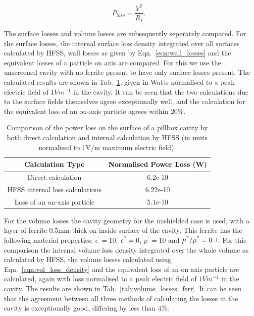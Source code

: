 \begin{equation}
P_{loss} = \frac{V^{2}}{R_{s}}.
\end{equation}

The surface losses and volume losses are subsequently seperately compared. For the surface losses, the internal surface loss density integrated over all surfaces calculated by HFSS, wall losses as given by Eqn.~\ref{eqn:wall_losses} and the equivalent losses of a particle on axis are compared. For this we use the unscreened cavity with no ferrite present to have only surface losses present. The calculated results are shown in Tab.~\ref{tab:surface_losses_ferr}, given in Watts normalised to a peak electric field of $1 V m^{-1}$ in the cavity. It can be seen that the two calculations due to the surface fields themselves agree exceptionally well, and the calculation for the equivalent loss of an on-axis particle agrees within 20\%. 

\begin{table}
\caption{Comparison of the power loss on the surface of a pillbox cavity by both direct calculation and internal calculation by HFSS (in units normalised to 1V/m maximum electric field).}
\begin{center}
\begin{tabular}{c | c }
Calculation Type & Normalised Power Loss (W)\\ \hline
Direct calculation & 6.2e-10\\ \hline
HFSS internal loss calculations & 6.22e-10 \\ \hline
Loss of an on-axis particle	 & 5.1e-10 \\
\end{tabular}
\end{center}
\label{tab:surface_losses_ferr}
\end{table}

For the volume losses the cavity geometry for the unshielded case is used, with a layer of ferrite 0.5mm thick on inside surface of the cavity. This ferrite has the following material properties; $\epsilon^{'} = 10$, $\epsilon^{"}=0$, $\mu^{'}=10$ and $\mu^{"} / \mu^{"} = 0.1$. For this comparison the internal volume loss density integrated over the whole volume as calculated by HFSS, the volume losses calculated using Eqn.~\ref{eqn:vol_loss_density} and the equivalent loss of an on axis particle are calculated, again with loss normalised to a peak electric field of $1 V m^{-1}$ in the cavity. The results are shown in Tab.~\ref{tab:volume_losses_ferr}. It can be seen that the agreement between all three methods of calculating the losses in the cavity is exceptionally good, differing by less than 4\%.

